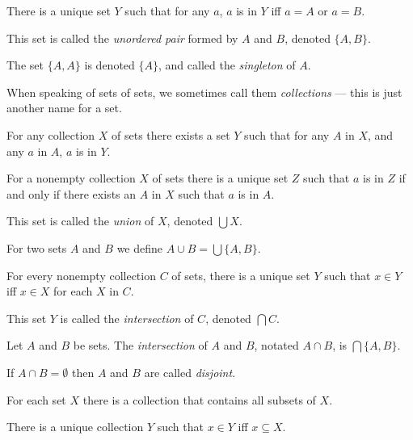 \begin{prop}
  There is a unique set $Y$ such that for any $a$, $a$ is in $Y$ iff $a=A$ or $a=B$.
\end{prop}
\begin{defn}
  This set is called the \emph{unordered pair} formed by $A$ and $B$, denoted
  $\{A,B\}$.
\end{defn}
\begin{defn}
  The set $\{A,A\}$ is denoted $\{A\}$, and called the \emph{singleton} of
  $A$.
\end{defn}
\begin{rem}
  When speaking of sets of sets, we sometimes call them \emph{collections} ---
  this is just another name for a set.
\end{rem}
\begin{axiom}[Union]
  For any collection $X$ of sets there exists a set $Y$ such that for any $A$ in
  $X$, and any $a$ in $A$, $a$ is in $Y$.
\end{axiom}
\begin{prop}
  For a nonempty collection $X$ of sets there is a unique set $Z$ such that $a$
  is in $Z$ if and only if there exists an $A$ in $X$ such that $a$ is in $A$.
\end{prop}
\begin{defn}
  This set is called the \emph{union} of $X$, denoted
  $\bigcup X$.

  For two sets $A$ and $B$ we define $A\cup B=\bigcup \{A,B\}$.
\end{defn}
\begin{prop}
  For every nonempty collection $C$ of sets, there is a unique set $Y$ such that
  $x\in Y$ iff $x\in X$ for each $X$ in $C$.
\end{prop}
\begin{defn}
  This set $Y$ is called the \emph{intersection} of $C$, denoted $\bigcap C$.
\end{defn}
\begin{defn}
  Let $A$ and $B$ be sets.
  The \emph{intersection} of $A$ and $B$, notated $A\cap B$, is
  $\bigcap\{A,B\}$.

  If $A\cap B=\emptyset$ then $A$ and $B$ are called \emph{disjoint}.
\end{defn}
\begin{axiom}[Powers]
  For each set $X$ there is a collection that contains all subsets of $X$.
\end{axiom}
\begin{prop}
  There is a unique collection $Y$ such that $x\in Y$ iff $x\subseteq X$.
\end{prop}
